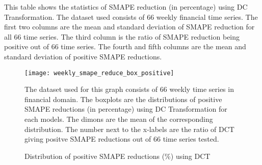\begin{table}[H]
    \caption{Statistics of SMAPE reduction (\%) using DCT (weekly finance)}
    {\raggedright \footnotesize This table shows the statistics of SMAPE reduction (in percentage) using DC Transformation. The dataset used consists of $66$ weekly financial time series. The first two columns are the mean and standard deviation of SMAPE reduction for all $66$ time series. The third column is the ratio of SMAPE reduction being positive out of $66$ time series. The fourth and fifth columns are the mean and standard deviation of positive SMAPE reductions. \par}
    \label{tbl: weekly smape reduction}
\end{table}
\begin{figure}[H]
    \centering
    \texttt{[image: weekly\_smape\_reduce\_box\_positive]}
    \caption{Distribution of positive SMAPE reductions (\%) using DCT}
    {\raggedright \footnotesize The dataset used for this graph consists of $66$ weekly time series in financial domain. The boxplots are the distributions of positive SMAPE reductions (in percentage) using DC Transformation for each models. The dimons are the mean of the corresponding distribution. The number next to the x-labels are the ratio of DCT giving positve SMAPE reductions out of $66$ time series tested.\par}
    \label{fig: weekly positive smape reduce box}
\end{figure}
